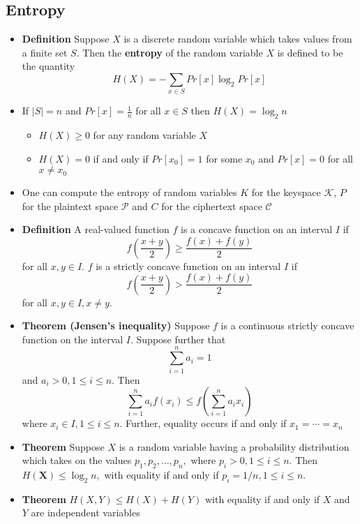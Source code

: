 \message{ !name(crypto-noter.tex)}\documentclass[a4, english]{article}
\begin{document}
\subsection{Entropy}
\begin{itemize}
  \item \textbf{Definition} Suppose $X$ is a discrete random variable which takes values from a finite set $S$. Then the \textbf{entropy} of the random variable $X$ is defined to be the quantity
  \begin{equation*}
    H(X) = -\sum_{x \in S} Pr [x] \log_2 Pr[x]
  \end{equation*}
  \item If $|S| =n$ and $Pr[x] = \frac{1}{n}$ for all $x \in S$ then $H(X) = \log_2 n$
  \begin{itemize}
	  \item $H(X) \geq 0$ for any random variable $X$
  	\item $H(X)=0$ if and only if $Pr[x_0]= 1$ for some $x_0$ and $Pr[x] = 0$ for all $x \neq x_0$
  \end{itemize}
  \item One can compute the entropy of random variables $K$ for the keyspace $\mathcal K$, $P$ for the plaintext space $\mathcal P$ and $C$ for the ciphertext space $\mathcal C$
  \item \textbf{Definition} A real-valued function $f$ is a concave function on an interval $I$ if
  \[
    f\left(\frac{x+y}{2}\right) \geq \frac{f(x)+f(y)}{2}
  \]
  for all $x, y \in I$. $f$ is a strictly concave function on an interval $I$ if
  \[
    f\left(\frac{x+y}{2}\right)>\frac{f(x)+f(y)}{2}
  \]
  for all $x, y \in I, x \neq y .$
  \item \textbf{Theorem (Jensen's inequality)} Suppose $f$ is a continuous strictly concave function on the interval $I$. Suppose further that
  $$
    \sum_{i=1}^{n} a_{i}=1
  $$
  and $a_{i}>0,1 \leq i \leq n$. Then
  $$
    \sum_{i=1}^{n} a_{i} f\left(x_{i}\right) \leq f\left(\sum_{i=1}^{n} a_{i} x_{i}\right)
  $$
  where $x_{i} \in I, 1 \leq i \leq n .$ Further, equality occurs if and only if $x_{1}=\cdots=x_{n}$
  \item \textbf{Theorem} Suppose $X$ is a random variable having a probability distribution which takes on the values $p_{1}, p_{2}, \ldots, p_{n},$ where $p_{i}>0,1 \leq i \leq n$. Then $H(\mathbf{X}) \leq \log _{2} n,$ with equality if and only if $p_{i}=1 / n, 1 \leq i \leq n$.
  \item \textbf{Theorem} $H(X,Y) \leq H(X) + H(Y)$ with equality if and only if $X$ and $Y$ are independent variables

\end{itemize}
\end{document}
